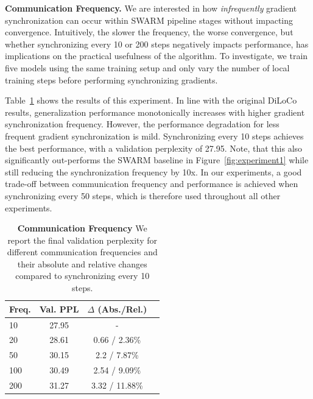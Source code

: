 \documentclass{article}
\begin{document}
\textbf{Communication Frequency.} We are interested in how \textit{infrequently}
gradient synchronization can occur within SWARM pipeline stages without
impacting convergence. Intuitively, the slower the frequency, the worse
convergence, but whether synchronizing every 10 or 200 steps negatively impacts
performance, has implications on the practical usefulness of the algorithm. To
investigate, we train five models using the same training setup and only vary
the number of local training steps before performing synchronizing gradients.


Table~\ref{tab:experiment2} shows the results of this experiment. In line with
the original DiLoCo results, generalization performance monotonically increases
with higher gradient synchronization frequency. However, the performance
degradation for less frequent gradient synchronization is mild. Synchronizing
every 10 steps achieves the best performance, with a validation perplexity of
27.95. Note, that this also significantly out-performs the SWARM baseline in
Figure~\ref{fig:experiment1} while still reducing the synchronization frequency
by 10x. In our experiments, a good trade-off between communication frequency and
performance is achieved when synchronizing every 50 steps, which is therefore
used throughout all other experiments.

\begin{table}[ht]
\centering
\begin{tabular}{lccc}
\toprule
\textbf{Freq.} & \textbf{Val. PPL} & \textbf{$\Delta$ (Abs./Rel.)} \\ 
\midrule
10 & 27.95 & - \\
20 & 28.61 & 0.66 / 2.36\% \\
50 & 30.15 & 2.2 / 7.87\% \\
100 & 30.49 & 2.54 / 9.09\% \\
200 & 31.27 & 3.32 / 11.88\% \\
\bottomrule
\end{tabular}
\caption{\textbf{Communication Frequency} We report the final validation
perplexity for different communication frequencies and their absolute and
relative changes compared to synchronizing every 10 steps.}
\label{tab:experiment2}
\end{table}
\end{document}
